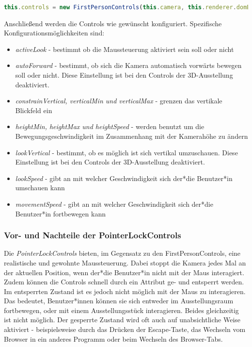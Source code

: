 \begin{lstlisting}[caption={FirstPersonControls initialisieren},language=TypeScript]
    this.controls = new FirstPersonControls(this.camera, this.renderer.domElement)
    \end{lstlisting}

Anschließend werden die Controls wie gewünscht konfiguriert. Spezifische Konfigurationsmöglichkeiten sind: 

\begin{itemize}
    \item \emph{activeLook} - bestimmt ob die Maussteuerung aktiviert sein soll oder nicht
    \item \emph{autoForward} - bestimmt, ob sich die Kamera automatisch vorwärts bewegen soll oder nicht. Diese Einstellung ist bei den Controls der 3D-Ausstellung deaktiviert.
    \item \emph{constrainVertical, verticalMin und verticalMax} - grenzen das vertikale Blickfeld ein
    \item \emph{heightMin, heightMax und heightSpeed} - werden benutzt um die Bewegungsgeschwindigkeit im Zusammenhang mit der Kamerahöhe zu ändern
    \item \emph{lookVertical} - bestimmt, ob es möglich ist sich vertikal umzuschauen. Diese Einstellung ist bei den Controls der 3D-Ausstellung deaktiviert.
    \item \emph{lookSpeed} - gibt an mit welcher Geschwindigkeit sich der*die Benutzer*in umschauen kann
    \item \emph{movementSpeed} - gibt an mit welcher Geschwindigkeit sich der*die Benutzer*in fortbewegen kann
\end{itemize}
\cite{FirstPersonControls}

\subsubsection{Vor- und Nachteile der PointerLockControls}

Die \emph{PointerLockControls} bieten, im Gegensatz zu den FirstPersonControls, eine realistische und gewohnte Maussteuerung. Dabei stoppt die Kamera jedes Mal an der aktuellen Position, wenn der*die Benutzer*in nicht mit der Maus interagiert. Zudem können die Controls schnell durch ein Attribut ge- und entsperrt werden. Im entsperrten Zustand ist es jedoch nicht möglich mit der Maus zu interagieren. Das bedeutet, Benutzer*innen können sie sich entweder im Ausstellungsraum fortbewegen, oder mit einem Ausstellungsstück interagieren. Beides gleichzeitig ist nicht möglich. Der gesperrte Zustand wird oft auch auf unabsichtliche Weise aktiviert - beispielsweise durch das Drücken der Escape-Taste, das Wechseln vom Browser in ein anderes Programm oder beim Wechseln des Browser-Tabs.  

